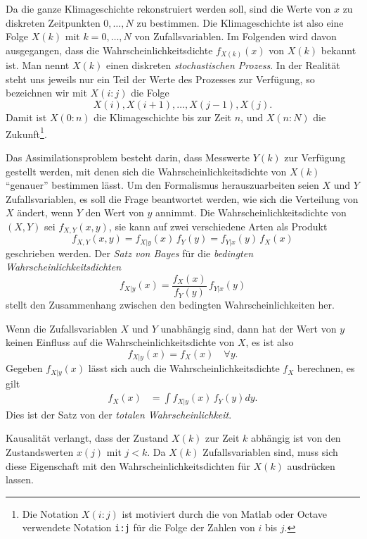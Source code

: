 Da die ganze Klimageschichte rekonstruiert werden soll, sind die Werte von
$x$ zu diskreten Zeitpunkten $0,\dots,N$ zu bestimmen.
Die Klimageschichte ist also eine Folge $X(k)$ mit $k=0,\dots,N$ von
Zufallsvariablen.
Im Folgenden wird davon ausgegangen, dass die Wahrscheinlichkeitsdichte
$f_{X(k)}(x)$ von $X(k)$ bekannt ist.
Man nennt $X(k)$ einen diskreten {\em stochastischen Prozess}.
%
%
In der Realität steht uns jeweils nur ein Teil der Werte des Prozesses zur
Verfügung, so bezeichnen wir mit $X(i:j)$ die Folge
\[
X(i),X(i+1),\dots,X(j-1),X(j).
\]
Damit ist $X(0:n)$ die Klimageschichte bis zur Zeit $n$, und $X(n:N)$ die
Zukunft\footnote{Die Notation $X(i:j)$ ist motiviert durch die 
von Matlab oder Octave verwendete Notation \texttt{i:j} für die
Folge der Zahlen von $i$ bis $j$.}.

Das Assimilationsproblem besteht darin, dass Messwerte $Y(k)$ zur Verfügung
gestellt werden, mit denen sich die Wahrscheinlichkeitsdichte von $X(k)$
``genauer'' bestimmen lässt.
Um den Formalismus herauszuarbeiten seien $X$ und $Y$ Zufallsvariablen,
es soll die Frage beantwortet werden, wie sich die Verteilung von $X$
ändert, wenn $Y$ den Wert von $y$  annimmt.
Die Wahrscheinlichkeitsdichte von $(X,Y)$ sei $f_{X,Y}(x,y)$, sie kann
auf zwei verschiedene Arten als Produkt
\begin{equation}
f_{X,Y}(x,y)
= 
f_{X|y}(x)\,f_Y(y)
=
f_{Y|x}(y)\,f_X(x)
\label{skript:bedpdf}
\end{equation}
geschrieben werden.
%
Der {\em Satz von Bayes} für die {\em bedingten Wahrscheinlichkeitsdichten}
\begin{equation}
f_{X|y}(x)
=
\frac{f_X(x)}{f_Y(y)}\,f_{Y|x}(y)
\label{assim:bayes}
\end{equation}
stellt den Zusammenhang zwischen den bedingten Wahrscheinlichkeiten her.

Wenn die Zufallsvariablen $X$ und $Y$ unabhängig sind, dann hat der
Wert von $y$ keinen Einfluss auf die Wahrscheinlichkeitsdichte von $X$,
es ist also
\[
f_{X|y}(x)
=
f_X(x)\quad\forall y.
\]
Gegeben $f_{X|y}(x)$ lässt sich auch die Wahrscheinlichkeitsdichte
$f_X$ berechnen, es gilt
\begin{align}
f_X(x)
&=
\int f_{X|y}(x)\,f_Y(y) dy.
\label{assim:total}
\end{align}
Dies ist der Satz von der {\em totalen Wahrscheinlichkeit}.
%

Kausalität verlangt, dass der Zustand $X(k)$ zur Zeit $k$ abhängig ist
von den Zustandswerten $x(j)$ mit $j<k$.
Da $X(k)$ Zufallsvariablen sind, muss sich diese Eigenschaft mit den
Wahrscheinlichkeitsdichten für $X(k)$ ausdrücken lassen.

